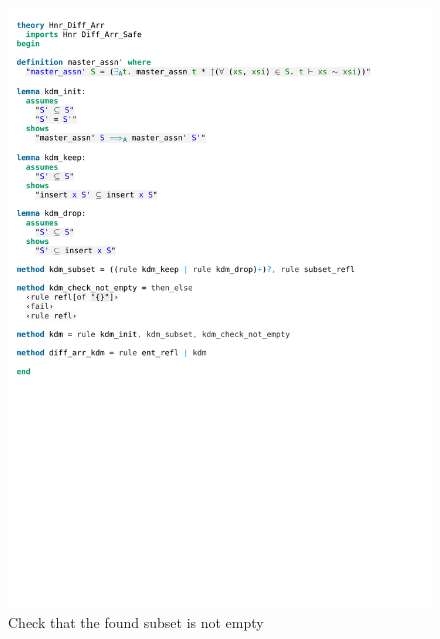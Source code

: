 \begin{figure}[!htpb]
    \includegraphics[trim={0 14,2cm 0 13,6cm}, clip, width=1.00\textwidth]{figures/Theory_Hnr_Diff_Arr_KDM.pdf}
    \caption[Check that the found subset is not empty]{Check that the found subset is not empty}
    \label{fig:kdm_check_not_empty}
\end{figure}

